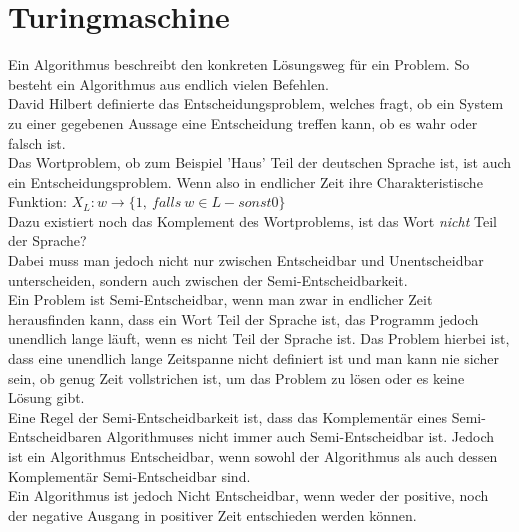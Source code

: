 \documentclass{article}
\begin{document}
	\section{Turingmaschine}
	Ein Algorithmus beschreibt den konkreten Lösungsweg für ein Problem. So besteht ein Algorithmus aus endlich vielen Befehlen. \\
	David Hilbert definierte das Entscheidungsproblem, welches fragt, ob ein System zu einer gegebenen Aussage eine Entscheidung treffen kann, ob es wahr oder falsch ist. \\
	Das Wortproblem, ob zum Beispiel 'Haus' Teil der deutschen Sprache ist, ist auch ein Entscheidungsproblem. Wenn also in endlicher Zeit ihre Charakteristische Funktion: $X_L:w\rightarrow \{1,\ falls\ w\in L - sonst 0\}$ \\
	Dazu existiert noch das Komplement des Wortproblems, ist das Wort \textit{nicht} Teil der Sprache? \\
	Dabei muss man jedoch nicht nur zwischen Entscheidbar und Unentscheidbar unterscheiden, sondern auch zwischen der Semi-Entscheidbarkeit. \\
	Ein Problem ist Semi-Entscheidbar, wenn man zwar in endlicher Zeit herausfinden kann, dass ein Wort Teil der Sprache ist, das Programm jedoch unendlich lange läuft, wenn es nicht Teil der Sprache ist. Das Problem hierbei ist, dass eine unendlich lange Zeitspanne nicht definiert ist und man kann nie sicher sein, ob genug Zeit vollstrichen ist, um das Problem zu lösen oder es keine Lösung gibt. \\
	Eine Regel der Semi-Entscheidbarkeit ist, dass das Komplementär eines Semi-Entscheidbaren Algorithmuses nicht immer auch Semi-Entscheidbar ist. Jedoch ist ein Algorithmus Entscheidbar, wenn sowohl der Algorithmus als auch dessen Komplementär Semi-Entscheidbar sind. \\
	Ein Algorithmus ist jedoch Nicht Entscheidbar, wenn weder der positive, noch der negative Ausgang in positiver Zeit entschieden werden können.
\end{document}
